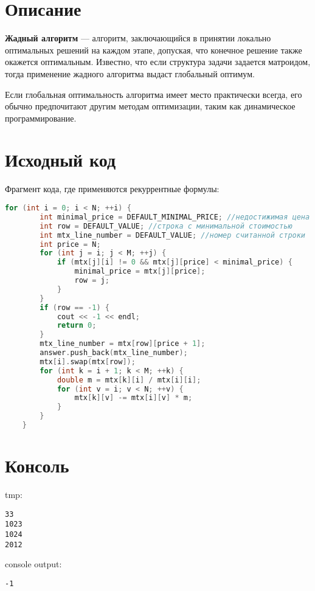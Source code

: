 \section{Описание}

\textbf{Жадный алгоритм} — алгоритм, заключающийся в принятии локально оптимальных решений на каждом этапе, допуская, что конечное решение также окажется оптимальным. Известно, что если структура задачи задается матроидом, тогда применение жадного алгоритма выдаст глобальный оптимум.

Если глобальная оптимальность алгоритма имеет место практически всегда, его обычно предпочитают другим методам оптимизации, таким как динамическое программирование.\newline
\pagebreak

\section{Исходный код}
Фрагмент кода, где применяются рекуррентные формулы:\newline


\begin{lstlisting}[language=C++]
for (int i = 0; i < N; ++i) {
        int minimal_price = DEFAULT_MINIMAL_PRICE; //недостижимая цена
        int row = DEFAULT_VALUE; //строка с минимальной стоимостью
        int mtx_line_number = DEFAULT_VALUE; //номер считанной строки
        int price = N;
        for (int j = i; j < M; ++j) {
            if (mtx[j][i] != 0 && mtx[j][price] < minimal_price) {
                minimal_price = mtx[j][price];
                row = j;
            }
        }
        if (row == -1) {
            cout << -1 << endl;
            return 0;
        }
        mtx_line_number = mtx[row][price + 1];
        answer.push_back(mtx_line_number);
        mtx[i].swap(mtx[row]);
        for (int k = i + 1; k < M; ++k) {
            double m = mtx[k][i] / mtx[i][i];
            for (int v = i; v < N; ++v) {
                mtx[k][v] -= mtx[i][v] * m;
            }
        }
    }

\end{lstlisting}

\section{Консоль}
tmp:
\begin{alltt}
3 3
1 0 2 3
1 0 2 4
2 0 1 2
\end{alltt}

console output:
\begin{alltt}
-1
\end{alltt}
\pagebreak